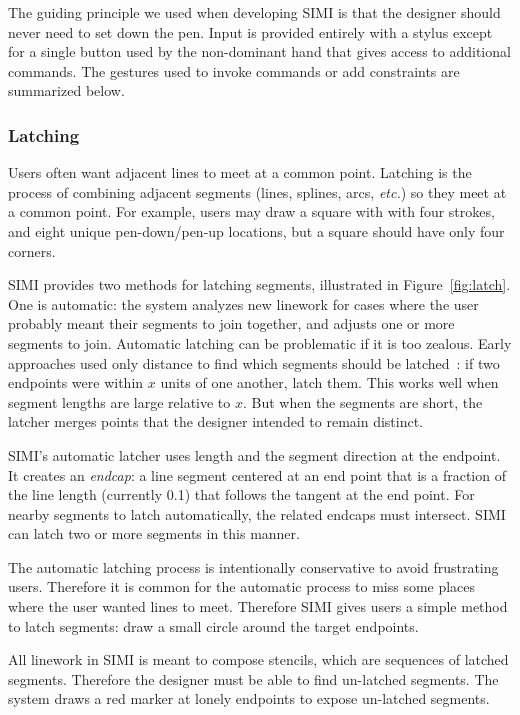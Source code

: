 \documentclass{article}
\begin{document}
The guiding principle we used when developing SIMI is that the
designer should never need to set down the pen. Input is provided
entirely with a stylus except for a single button used by the
non-dominant hand that gives access to additional commands. The
gestures used to invoke commands or add constraints are summarized
below.

\subsubsection{Latching}

Users often want adjacent lines to meet at a common point. Latching is
the process of combining adjacent segments (lines, splines, arcs,
\textit{etc.}) so they meet at a common point. For example, users may
draw a square with with four strokes, and eight unique pen-down/pen-up
locations, but a square should have only four corners.

SIMI provides two methods for latching segments, illustrated in
Figure~\ref{fig:latch}. One is automatic: the system analyzes new
linework for cases where the user probably meant their segments to
join together, and adjusts one or more segments to join. Automatic
latching can be problematic if it is too zealous. Early approaches
used only distance to find which segments should be
latched~\cite{herot-latch-corners}: if two endpoints were within $x$
units of one another, latch them. This works well when segment lengths
are large relative to $x$. But when the segments are short, the
latcher merges points that the designer intended to remain distinct.

SIMI's automatic latcher uses length and the segment direction at the
endpoint. It creates an \textit{endcap}: a line segment centered at an
end point that is a fraction of the line length (currently 0.1) that
follows the tangent at the end point. For nearby segments to latch
automatically, the related endcaps must intersect. SIMI can latch two
or more segments in this manner.

The automatic latching process is intentionally conservative to avoid
frustrating users. Therefore it is common for the automatic process to
miss some places where the user wanted lines to meet. Therefore SIMI
gives users a simple method to latch segments: draw a small circle
around the target endpoints.

All linework in SIMI is meant to compose stencils, which are sequences
of latched segments. Therefore the designer must be able to find
un-latched segments. The system draws a red marker at lonely endpoints
to expose un-latched segments.
\end{document}
